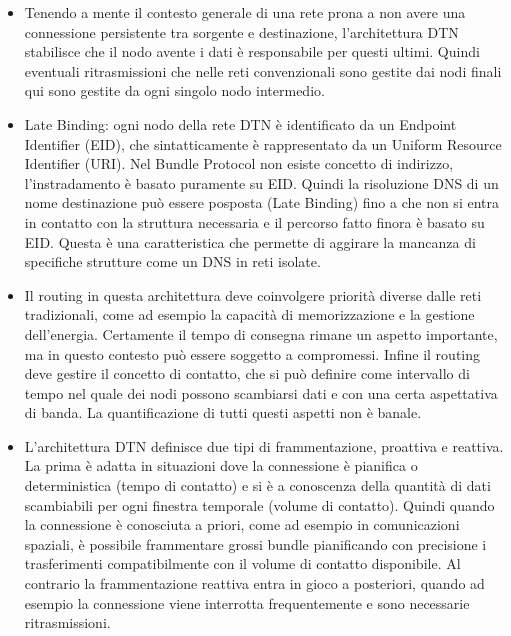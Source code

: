\documentclass[12pt,a4paper,oneside]{book}
\begin{document}
\begin{itemize}
			\item Tenendo a mente il contesto generale di una rete prona a non avere una connessione persistente tra sorgente e destinazione, l'architettura DTN stabilisce che il nodo avente i dati è responsabile per questi ultimi. Quindi eventuali ritrasmissioni che nelle reti convenzionali sono gestite dai nodi finali qui sono gestite da ogni singolo nodo intermedio.
			
			\item Late Binding: ogni nodo della rete DTN è identificato da un Endpoint Identifier (EID), che sintatticamente è rappresentato da un Uniform Resource Identifier (URI). Nel Bundle Protocol non esiste concetto di indirizzo, l'instradamento è basato puramente su EID. Quindi la risoluzione DNS di un nome destinazione può essere posposta (Late Binding) fino a che non si entra in contatto con la struttura necessaria e il percorso fatto finora è basato su EID. Questa è una caratteristica che permette di aggirare la mancanza di specifiche strutture come un DNS in reti isolate.
			
			\item Il routing in questa architettura deve coinvolgere priorità diverse dalle reti tradizionali, come ad esempio la capacità di memorizzazione e la gestione dell'energia. Certamente il tempo di consegna rimane un aspetto importante, ma in questo contesto può essere soggetto a compromessi. Infine il routing deve gestire il concetto di contatto, che si può definire come intervallo di tempo nel quale dei nodi possono scambiarsi dati e con una certa aspettativa di banda. La  quantificazione di tutti questi aspetti non è banale.
			
			\item L'architettura DTN definisce due tipi di frammentazione, proattiva e reattiva. La prima è adatta in situazioni dove la connessione è pianifica o deterministica (tempo di contatto) e si è a conoscenza della quantità di dati scambiabili per ogni finestra temporale (volume di contatto). Quindi quando la connessione è conosciuta a priori, come ad esempio in comunicazioni spaziali, è possibile frammentare grossi bundle pianificando con precisione i trasferimenti compatibilmente con il volume di contatto disponibile.
			Al contrario la frammentazione reattiva entra in gioco a posteriori, quando ad esempio la connessione viene interrotta frequentemente e sono necessarie ritrasmissioni.
			
			
		\end{itemize}
		
\end{document}
